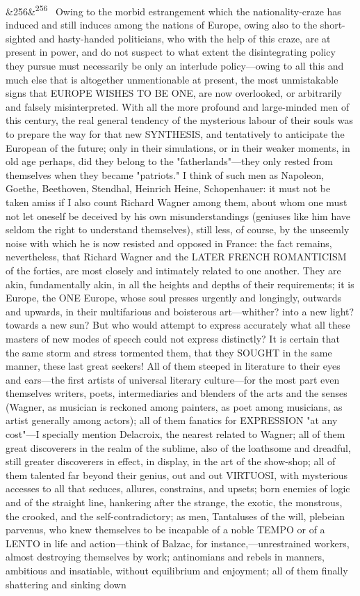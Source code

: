 \documentclass[12pt]{article}
\newcommand{\para}[1][]{\par\noindent\ifx&#1&\else\textsuperscript{\footnotesize #1}~\fi}
\begin{document}
\para[256] Owing to the morbid estrangement which the nationality-craze has induced and still induces among the nations of Europe, owing also to the short-sighted and hasty-handed politicians, who with the help of this craze, are at present in power, and do not suspect to what extent the disintegrating policy they pursue must necessarily be only an interlude policy---owing to all this and much else that is altogether unmentionable at present, the most unmistakable signs that EUROPE WISHES TO BE ONE, are now overlooked, or arbitrarily and falsely misinterpreted. With all the more profound and large-minded men of this century, the real general tendency of the mysterious labour of their souls was to prepare the way for that new SYNTHESIS, and tentatively to anticipate the European of the future; only in their simulations, or in their weaker moments, in old age perhaps, did they belong to the "fatherlands"---they only rested from themselves when they became "patriots." I think of such men as Napoleon, Goethe, Beethoven, Stendhal, Heinrich Heine, Schopenhauer: it must not be taken amiss if I also count Richard Wagner among them, about whom one must not let oneself be deceived by his own misunderstandings (geniuses like him have seldom the right to understand themselves), still less, of course, by the unseemly noise with which he is now resisted and opposed in France: the fact remains, nevertheless, that Richard Wagner and the LATER FRENCH ROMANTICISM of the forties, are most closely and intimately related to one another. They are akin, fundamentally akin, in all the heights and depths of their requirements; it is Europe, the ONE Europe, whose soul presses urgently and longingly, outwards and upwards, in their multifarious and boisterous art---whither? into a new light? towards a new sun? But who would attempt to express accurately what all these masters of new modes of speech could not express distinctly? It is certain that the same storm and stress tormented them, that they SOUGHT in the same manner, these last great seekers! All of them steeped in literature to their eyes and ears---the first artists of universal literary culture---for the most part even themselves writers, poets, intermediaries and blenders of the arts and the senses (Wagner, as musician is reckoned among painters, as poet among musicians, as artist generally among actors); all of them fanatics for EXPRESSION "at any cost"---I specially mention Delacroix, the nearest related to Wagner; all of them great discoverers in the realm of the sublime, also of the loathsome and dreadful, still greater discoverers in effect, in display, in the art of the show-shop; all of them talented far beyond their genius, out and out VIRTUOSI, with mysterious accesses to all that seduces, allures, constrains, and upsets; born enemies of logic and of the straight line, hankering after the strange, the exotic, the monstrous, the crooked, and the self-contradictory; as men, Tantaluses of the will, plebeian parvenus, who knew themselves to be incapable of a noble TEMPO or of a LENTO in life and action---think of Balzac, for instance,---unrestrained workers, almost destroying themselves by work; antinomians and rebels in manners, ambitious and insatiable, without equilibrium and enjoyment; all of them finally shattering and sinking down 
\end{document}
